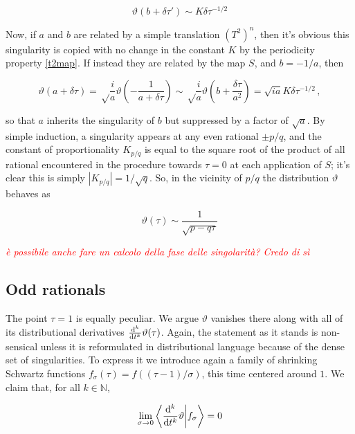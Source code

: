 \documentclass{article}
\newcommand{\cmnt}[1]{\textcolor{red}{\emph{#1}}}
\begin{document}
\begin{equation}
    \vartheta(b + \delta\tau') \sim K \delta \tau^{-1/2}
\end{equation}

Now, if $a$ and $b$ are related by a simple translation $(T^2)^n$, then it's obvious this singularity is copied with no change in the constant $K$ by the periodicity property \eqref{t2map}. If instead they are related by the map $S$, and $b = -1/a$, then

\begin{equation}
    \vartheta(a + \delta\tau) = \sqrt\frac{i}{a} \vartheta\left(-\frac{1}{a+\delta\tau}\right) \sim \sqrt\frac{i}{a} \vartheta(b + \frac{\delta \tau}{a^2}) = \sqrt{ia} K \delta\tau^{-1/2}\,,
\end{equation}

so that $a$ inherits the singularity of $b$ but suppressed by a factor of $\sqrt{a}$. By simple induction, a singularity appears at any even rational $\pm p/q$, and the constant of proportionality $K_{p/q}$ is equal to the square root of the product of all rational encountered in the procedure towards $\tau = 0$ at each application of $S$; it's clear this is simply $|K_{p/q}| = 1/\sqrt{q}$. So, in the vicinity of $p/q$ the distribution $\vartheta$ behaves as

\begin{equation}
    \vartheta(\tau) \sim \frac{1}{\sqrt{p-q\tau}}
\end{equation}

\cmnt{è possibile anche fare un calcolo della fase delle singolarità? Credo di sì}

\subsection{Odd rationals}

The point $\tau=1$ is equally peculiar. We argue $\vartheta$ vanishes there along with all of its distributional derivatives $\dv[k]{t} \vartheta(\tau)$. Again, the statement as it stands is non-sensical unless it is reformulated in distributional language because of the dense set of singularities. To express it we introduce again a family of shrinking Schwartz functions $f_\sigma(\tau) = f((\tau-1)/\sigma)$, this time centered around $1$. We claim that, for all $k \in \mathbb{N}$,

\begin{equation}
    \lim_{\sigma \rightarrow 0} \bra{ \dv[k]{t}\vartheta}\ket{ f_\sigma } = 0
\end{equation}
\end{document}
